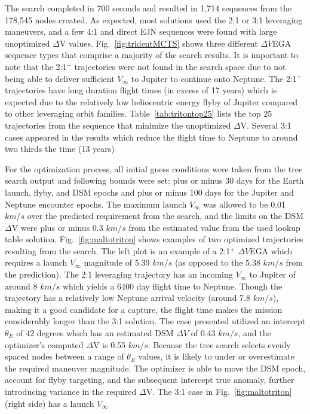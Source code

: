 \documentclass[letterpaper, preprint, paper,11pt]{AAS}	%
\begin{document}
The search completed in 700 seconds and resulted in 1,714 sequences from the 178,545 nodes created. As expected, most solutions used the 2:1 or 3:1 leveraging maneuvers, and a few 4:1 and direct EJN sequences were found with large unoptimized $\Delta$V values. Fig.~\ref{fig:tridentMCTS} shows three different $\Delta V$EGA sequence types that comprise a majority of the search results. It is important to note that the 2:1$^{-}$ trajectories were not found in the search space due to not being able to deliver sufficient $V_\infty$ to Jupiter to continue onto Neptune. The 2:1$^{+}$ trajectories have long duration flight times (in excess of 17 years) which is expected due to the relatively low heliocentric energy flyby of Jupiter compared to other leveraging orbit families. Table~\ref{tab:tritontop25} lists the top 25 trajectories from the sequence that minimize the unoptimized $\Delta$V. Several 3:1 cases appeared in the results which reduce the flight time to Neptune to around two thirds the time (13 years) 

For the optimization process, all initial guess conditions were taken from the tree search output and following bounds were set: plus or minus 30 days for the Earth launch, flyby, and DSM epochs and plus or minus 100 days for the Jupiter and Neptune encounter epochs. The maximum launch $V_\infty$ was allowed to be 0.01 $km/s$ over the predicted requirement from the search, and the limits on the DSM $\Delta$V were plus or minus 0.3 $km/s$ from the estimated value from the used lookup table solution. Fig.~\ref{fig:maltotriton} shows examples of two optimized trajectories resulting from the search. The left plot is an example of a 2:1$^{+}$ $\Delta V$EGA which requires a launch $V_\infty$ magnitude of 5.39 $km/s$ (as opposed to the 5.38 $km/s$ from the prediction). The 2:1 leveraging trajectory has an incoming $V_\infty$ to Jupiter of around 8 $km/s$ which yields a 6400 day flight time to Neptune. Though the trajectory has a relatively low Neptune arrival velocity (around 7.8 $km/s$), making it a good candidate for a capture, the flight time makes the mission considerably longer than the 3:1 solution. The case presented utilized an intercept $\theta_E$ of 42 degrees which has an estimated DSM $\Delta V$ of 0.43 $km/s$, and the optimizer's computed $\Delta$V is 0.55 $km/s$. Because the tree search selects evenly spaced nodes between a range of $\theta_E$ values, it is likely to under or overestimate the required maneuver magnitude. The optimizer is able to move the DSM epoch, account for flyby targeting, and the subsequent intercept true anomaly, further introducing variance in the required $\Delta$V. The 3:1 case in Fig.~\ref{fig:maltotriton} (right side) has a launch $V_\infty$
\end{document}
